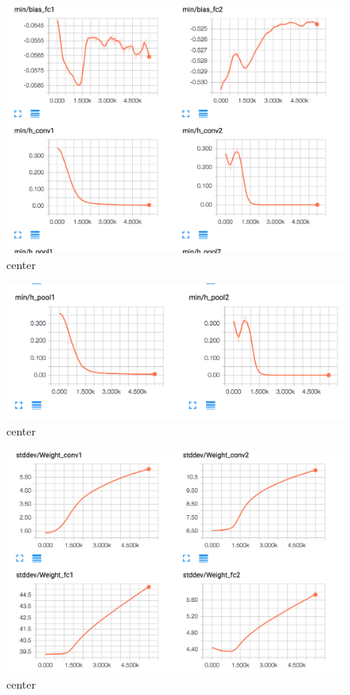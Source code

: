 \documentclass[12pt]{article}
\begin{document}
\begin{figure}[H]
  \caption{center}
  \centering
    \includegraphics[scale=0.3]{min3.png}
\end{figure}
\begin{figure}[H]
  \caption{center}
  \centering
    \includegraphics[scale=0.3]{min4.png}
\end{figure}
\begin{figure}[H]
  \caption{center}
  \centering
    \includegraphics[scale=0.3]{st1.png}
\end{figure}
\end{document}
